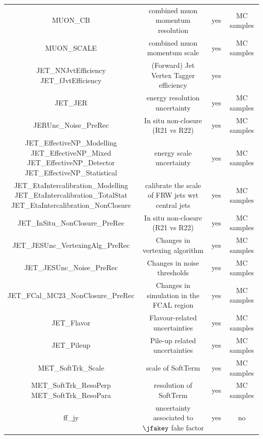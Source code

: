\begin{table}[!htbp]
\begin{tabular}{ c | c  | c | c}
      MUON\_CB &  combined muon momentum resolution   & yes  & MC samples   \\ 
      MUON\_SCALE &  combined muon momentum scale   & yes  & MC samples   \\ \hline
      \makecell{JET\_NNJvtEfficiency \\
      JET\_fJvtEfficiency} &  (Forward) Jet Vertex Tagger efficiency  & yes    \\ 
      JET\_JER  &  energy resolution uncertainty  & yes & MC samples  \\ 
      JERUnc\_Noise\_PreRec  & In situ non-closure (R21 vs R22)   & yes & MC samples  \\ 
      \makecell{JET\_EffectiveNP\_Modelling \\
      JET\_EffectiveNP\_Mixed\\
      JET\_EffectiveNP\_Detector\\
      JET\_EffectiveNP\_Statistical} &  energy scale uncertainty & yes  & MC samples \\ 
      \makecell{JET\_EtaIntercalibration\_Modelling \\
      JET\_EtaIntercalibration\_TotalStat \\
      JET\_EtaIntercalibration\_NonClosure} &  calibrate the scale of FRW jets wrt central jets  & yes & MC samples  \\ 
      JET\_InSitu\_NonClosure\_PreRec  &  In situ non-closure (R21 vs R22)  & yes  & MC samples \\ 
      JET\_JESUnc\_VertexingAlg\_PreRec &  Changes in vertexing algorithm  & yes & MC samples  \\ 
      JET\_JESUnc\_Noise\_PreRec &  Changes in noise thresholds  & yes  & MC samples \\ 
      JET\_FCal\_MC23\_NonClosure\_PreRec &  Changes in simulation in the FCAL region  & yes  & MC samples \\ 
      JET\_Flavor & Flavour-related uncertainties   & yes & MC samples \\ 
      JET\_Pileup & Pile-up related uncertainties  & yes & MC samples \\ \hline
      MET\_SoftTrk\_Scale      &	scale of SoftTerm   & yes  & MC samples     \\ 
      \makecell{ MET\_SoftTrk\_ResoPerp   \\
      MET\_SoftTrk\_ResoPara }      &	resolution of SoftTerm    & yes  & MC samples   \\ \hline
      ff\_jy  &  uncertainty associated to $\jfakey$ fake factor  & yes  & no  \\ 

\end{tabular}
\end{table}

